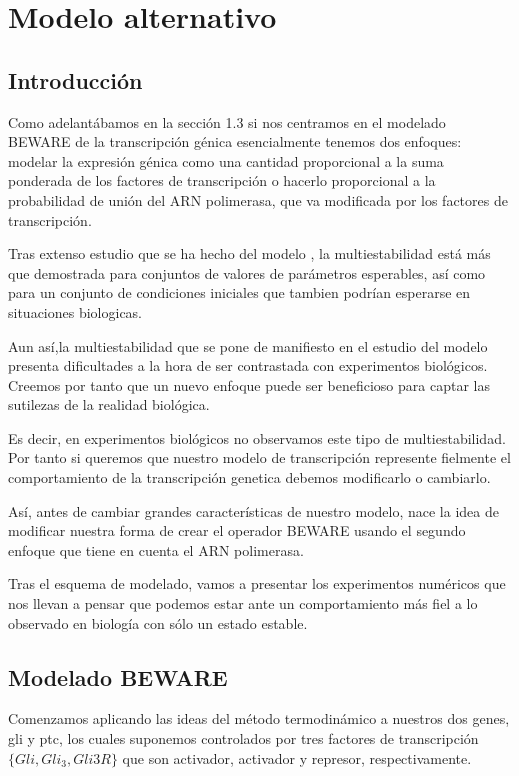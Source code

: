\chapter{Modelo alternativo}

\label{ch:modelo_alternativo}

\section{Introducción}

Como adelantábamos en la sección 1.3 si nos centramos en el modelado BEWARE de la transcripción génica esencialmente tenemos dos enfoques: modelar la expresión génica como una cantidad proporcional a la suma ponderada de los factores de transcripción o hacerlo proporcional a la probabilidad de unión del ARN polimerasa, que va modificada por los factores de transcripción.

Tras extenso estudio que se ha hecho del modelo \cite{schaffer}, la multiestabilidad está más que demostrada para conjuntos de valores de parámetros esperables, así como para un conjunto de condiciones iniciales que tambien podrían esperarse en situaciones biologicas. 

Aun así,la multiestabilidad que se pone de manifiesto en el estudio del modelo presenta dificultades a la hora de ser contrastada con experimentos biológicos. Creemos por tanto que un nuevo enfoque puede ser beneficioso para captar las sutilezas de la realidad biológica.

Es decir, en experimentos biológicos no observamos este tipo de multiestabilidad. Por tanto si queremos que nuestro modelo de transcripción represente fielmente el comportamiento de la transcripción genetica debemos modificarlo o cambiarlo.

Así, antes de cambiar grandes características de nuestro modelo, nace la idea de modificar nuestra forma de crear el operador BEWARE usando el segundo enfoque que tiene en cuenta el ARN polimerasa. 

Tras el esquema de modelado, vamos a presentar los experimentos numéricos que nos llevan a pensar que podemos estar ante un comportamiento más fiel a lo observado en biología con sólo un estado estable. 

\section{Modelado BEWARE}
Comenzamos aplicando las ideas del método termodinámico a nuestros dos genes, gli y ptc, los cuales suponemos controlados por tres factores de transcripción $\{Gli, Gli_3, Gli3R\} $ que son activador, activador y represor, respectivamente.

